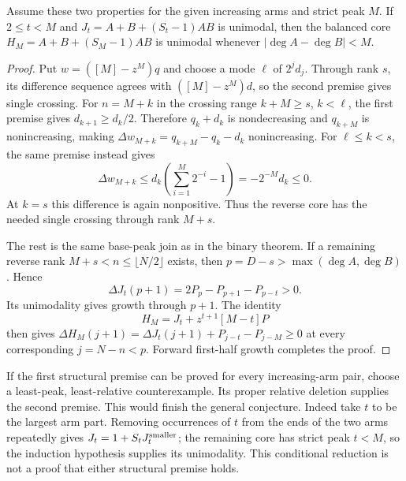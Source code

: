 \begin{proposition}
Assume these two properties for the given increasing arms and
strict peak $M$. If $2\le t<M$ and
$J_t=A+B+(S_t-1)AB$ is unimodal, then the balanced core
$H_M=A+B+(S_M-1)AB$ is unimodal whenever $|\deg A-\deg B|<M$.
\end{proposition}
\begin{proof}
Put $w=([M]-z^M)q$ and choose a mode $\ell$ of $2^jd_j$.
Through rank $s$, its difference sequence agrees with
$([M]-z^M)d$, so the second premise gives single crossing.
For $n=M+k$ in the crossing range $k+M\ge s$, $k<\ell$,
the first premise gives $d_{k+1}\ge d_k/2$. Therefore
$q_k+d_k$ is nondecreasing and $q_{k+M}$ is nonincreasing,
making $\Delta w_{M+k}=q_{k+M}-q_k-d_k$ nonincreasing.
For $\ell\le k<s$, the same premise instead gives
\[
 \Delta w_{M+k}\le d_k\left(\sum_{i=1}^M2^{-i}-1\right)
                    =-2^{-M}d_k\le0.
\]
At $k=s$ this difference is again nonpositive. Thus the reverse
core has the needed single crossing through rank $M+s$.

The rest is the same base-peak join as in the binary theorem.
If a remaining reverse rank $M+s<n\le\lfloor N/2\rfloor$
exists, then $p=D-s>\max(\deg A,\deg B)$. Hence
\[
 \Delta J_t(p+1)=2P_p-P_{p+1}-P_{p-t}>0.
\]
Its unimodality gives growth through $p+1$. The identity
\[
                      H_M=J_t+z^{t+1}[M-t]P
\]
then gives $\Delta H_M(j+1)=\Delta J_t(j+1)+P_{j-t}-P_{j-M}
\ge0$ at every corresponding $j=N-n<p$.
Forward first-half growth completes the proof.
\end{proof}

If the first structural premise can be proved for every increasing-arm
pair, choose a least-peak, least-relative counterexample. Its proper
relative deletion supplies the second premise. This would finish the
general conjecture. Indeed take $t$ to be the largest
arm part. Removing occurrences of $t$ from the ends of the two arms
repeatedly gives $J_t=1+S_tJ_t^{\rm smaller}$; the remaining core
has strict peak $t<M$, so the induction hypothesis supplies its
unimodality. This conditional reduction is not a proof that either
structural premise holds.
